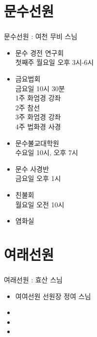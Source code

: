 \documentclass[aspectratio=1610,20pt,xcolor=pdftex,dvipsnames,table,handout]{beamer}
\begin{document}
		\section{문수선원 }
		\begin{frame} [t,plain]
		\frametitle{ }
			\begin{block} {문수선원 : 여천 무비 스님 }
			\setlength{\leftmargini}{1em}			
			\begin{itemize}
				\item \hrulefill	문수 경전 연구회 		
						\\ 첫째주 월요일 오후 3시-6시
				\item \hrulefill	금요법회 				
						\\	금요일 10시 30분
						\\ 1주 화엄경 강좌
						\\ 2주 참선
						\\ 3주 화엄경 강좌
						\\ 4주 법화경 사경
				\item \hrulefill	문수불교대학원			
						\\ 수요일 10시, 오후 7시
				\item \hrulefill	문수 사경반				
						\\ 금요일 오후 1시
				\item \hrulefill 친불회 					
						\\ 월요일 오전 10시
				\item \hrulefill 염화실
			\end{itemize}
			\end{block}						


		\end{frame}						



		\section{여래선원 }
		\begin{frame} [t,plain]
		\frametitle{ }
			\begin{block} {여래선원 : 효산 스님 }
			\setlength{\leftmargini}{1em}			
			\begin{itemize}
				\item 여여선원 선원장 정여 스님
				\item 
				\item 
				\item 
			\end{itemize}
			\end{block}						


		\end{frame}						
\end{document}
